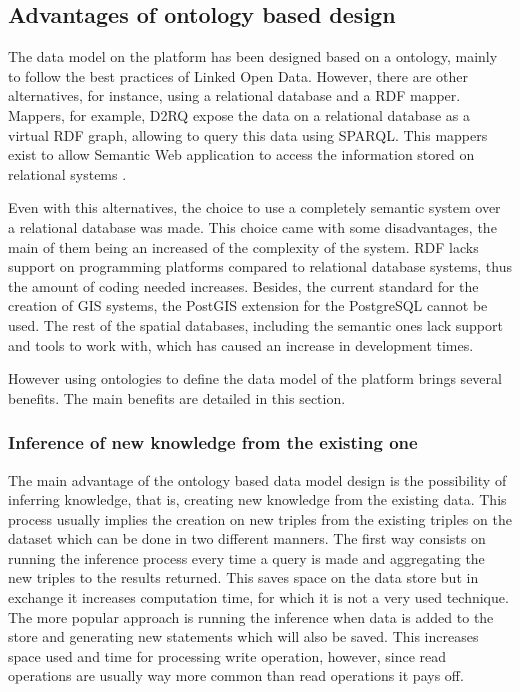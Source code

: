 \subsection{Advantages of ontology based design}

The data model on the platform has been designed based on a ontology, mainly to follow the best practices of Linked Open Data. However, there are other alternatives, for instance, using a relational database and a RDF mapper. Mappers, for example, D2RQ expose the data on a relational database as a virtual RDF graph, allowing to query this data using SPARQL. This mappers exist to allow Semantic Web application to access the information stored on relational systems \cite{d2rq}.

Even with this alternatives, the choice to use a completely semantic system over a relational database was made. This choice came with some disadvantages, the main of them being an increased of the complexity of the system. RDF lacks support on programming platforms compared to relational database systems, thus the amount of coding needed increases. Besides, the current standard for the creation of GIS systems, the PostGIS \cite{postgis} extension for the PostgreSQL \cite{postgres} cannot be used. The rest of the spatial databases, including the semantic ones lack support and tools to work with, which has caused an increase in development times.

However using ontologies to define the data model of the platform brings several benefits. The main benefits are detailed in this section.

\subsubsection*{Inference of new knowledge from the existing one}

The main advantage of the ontology based data model design is the possibility of inferring knowledge, that is, creating new knowledge from the existing data. This process usually implies the creation on new triples from the existing triples on the dataset which can be done in two different manners. The first way consists on running the inference process every time a query is made and aggregating the new triples to the results returned. This saves space on the data store but in exchange it increases computation time, for which it is not a very used technique. The more popular approach is running the inference when data is added to the store and generating new statements which will also be saved. This increases space used and time for processing write operation, however, since read operations are usually way more common than read operations it pays off.

